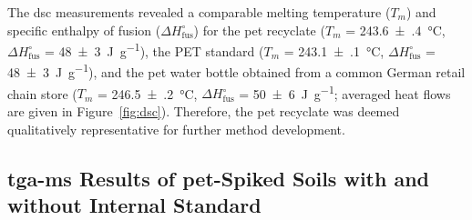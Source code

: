 The \ac{dsc} measurements revealed a comparable melting temperature ($T_m$) and specific enthalpy of fusion ($\Delta H^\circ_\text{fus}$) for
the \ac{pet} recyclate ($T_m$ = \SI{243.6(4)}{\degreeCelsius}, $\Delta H^\circ_\text{fus}$ = \SI{48(3)}{\joule\per\gram}),
the PET standard ($T_m$ = \SI{243.1(1)}{\degreeCelsius}, $\Delta H^\circ_\text{fus}$ = \SI{48(3)}{\joule\per\gram}), and
the \ac{pet} water bottle obtained from a common German retail chain store ($T_m$ = \SI{246.5(2)}{\degreeCelsius}, $\Delta H^\circ_\text{fus}$ = \SI{50(6)}{\joule\per\gram}; averaged heat flows are given in Figure~\ref{fig:dsc}).
Therefore, the \ac{pet} recyclate was deemed qualitatively representative for further method development.

\subsection{\Acs{tga-ms} Results of \Acs{pet}-Spiked Soils with and without Internal Standard}

